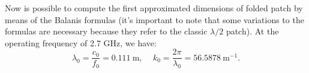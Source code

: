 \documentclass[11pt]{report}
\begin{document}
Now is possible to compute the first approximated dimensions of folded patch by means of the Balanis formulas (it's important to note that some variations to the formulas are necessary because they refer to the classic $\lambda/2$ patch). At the operating frequency of 2.7 GHz, we have:
\begin{equation}
\lambda_{0}=\frac{c_{0}}{f_{0}}=0.111 \mathrm{~m} \text{, } \quad k_{0}=\frac{2 \pi}{\lambda_{0}}=56.5878 \mathrm{~m}^{-1}.
\end{equation}
\end{document}
